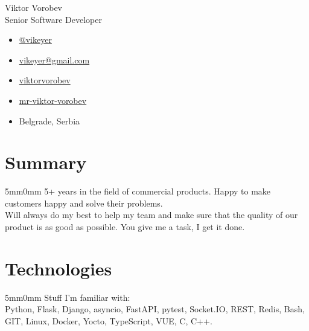 \documentclass[10pt]{article}
\newcommand{\lmvalue}{5mm}
\newcommand{\rmvalue}{0mm}
\begin{document}
    \begin{minipage}[b]{0.78\linewidth}
    {\fontsize{28pt}{28pt}\selectfont Viktor Vorobev}
        \\[1em]
        {\color{gray}\fontsize{16pt}{16pt}\selectfont Senior Software Developer}
    \end{minipage}
    \hfill%
    \begin{minipage}[b]{0.24\linewidth}
        \begin{flushleft}
            \begin{itemize}
                \item[\color{cyan}\faPaperPlane] \href{https://t.me/vikeyer}{@vikeyer}
                \item[\color{cyan}\faEnvelope] \href{mailto:vikeyer@gmail.com}{vikeyer@gmail.com}
                \item[\color{cyan}\faGithub] \href{https://github.com/viktorvorobev}{viktorvorobev}
                \item[\color{cyan}\faLinkedin] \href{https://www.linkedin.com/in/mr-viktor-vorobev/}{mr-viktor-vorobev}
                \item[\faBuildingO] Belgrade, Serbia
            \end{itemize}
        \end{flushleft}
    \end{minipage}
    \vspace{3mm}
    \section*{Summary}
    \begin{changemargin}{\lmvalue}{\rmvalue}
        5+ years in the field of commercial products.
        Happy to make customers happy and solve their problems.\\
        Will always do my best to help my team and make sure that the quality of our product is as good as possible.
        You give me a task, I get it done.
    \end{changemargin}
    \section*{Technologies}
    \begin{changemargin}{\lmvalue}{\rmvalue}
        Stuff I'm familiar with:\\
        Python, Flask, Django, asyncio, FastAPI, pytest, Socket.IO, REST, Redis, Bash, GIT, Linux,
        Docker, Yocto, TypeScript, VUE, C, C++.
    \end{changemargin}
\end{document}
